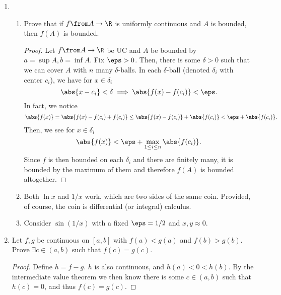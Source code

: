 \documentclass{article}
\begin{document}
\begin{enumerate}
  \item
        \begin{enumerate}

          \item Prove that if $f \from A \to \R$ is uniformly continuous and $A$ is bounded, then $f(A)$ is bounded.

                \begin{proof}
                  Let $f \from A \to \R$ be UC and $A$ be bounded by $a = \sup A, b = \inf A$.
                  Fix $\eps > 0$. Then, there is some $\delta > 0$ such that we can cover $A$ with $n$ many $\delta$-balls.
                  In each $\delta$-ball (denoted $\delta_{i}$ with center $c_{i}$), we have for $x \in \delta_{i}$
                  \[ \abs{x - c_{i}} < \delta \implies \abs{f(x) - f(c_{i})} < \eps. \]
                  In fact, we notice
                  \[ \abs{f(x)} = \abs{f(x) - f(c_{i}) + f(c_{i})} \le \abs{f(x) - f(c_{i})} + \abs{f(c_{i})} < \eps + \abs{f(c_{i})}. \]
                  Then, we see for $x \in \delta_{i}$
                  \[ \abs{f(x)} < \eps + \max\limits_{1 \le i \le n}\abs{f(c_{i})}. \]
                  Since $f$ is then bounded on each $\delta_{i}$ and there are finitely many, it is bounded by the maximum of them and therefore
                  $f(A)$ is bounded altogether.
                \end{proof}

          \item Both $\ln x$ and $1/x$ work, which are two sides of the same coin. Provided, of course, the coin is differential (or integral) calculus.

          \item Consider $\sin(1/x)$ with a fixed $\eps = 1/2$ and $x, y \approx 0$.

        \end{enumerate}

  \item Let $f, g$ be continuous on $[a, b]$ with $f(a) < g(a)$ and $f(b) > g(b)$. Prove $\exists c \in (a, b)$ such that $f(c) = g(c)$.

        \begin{proof}
          Define $h = f - g$. $h$ is also continuous, and $h(a) < 0 < h(b)$.
          By the intermediate value theorem we then know there is some $c \in (a, b)$ such that $h(c) = 0$, and thus $f(c) = g(c)$.
        \end{proof}
\end{enumerate}
\end{document}
